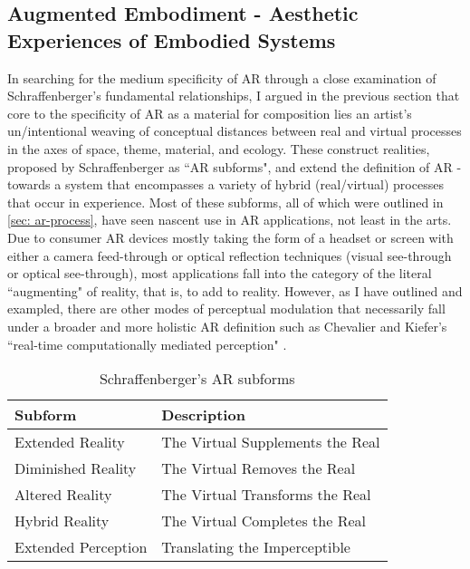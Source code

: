 \subsection[Augmented Embodiment]{Augmented Embodiment - Aesthetic Experiences of Embodied Systems} \label{sec: discussion-medium-embodiment}
In searching for the medium specificity of AR through a close examination of Schraffenberger's fundamental relationships, I argued in the previous section that core to the specificity of AR as a material for composition lies an artist's un/intentional weaving of conceptual distances between real and virtual processes in the axes of space, theme, material, and ecology. These construct realities, proposed by Schraffenberger as ``AR subforms", and extend the definition of AR - towards a system that encompasses a variety of hybrid (real/virtual) processes that occur in experience. Most of these subforms, all of which were outlined in \autoref{sec: ar-process}, have seen nascent use in AR applications, not least in the arts. Due to consumer AR devices mostly taking the form of a headset or screen with either a camera feed-through or optical reflection techniques (visual see-through or optical see-through), most applications fall into the category of the literal ``augmenting" of reality, that is, to add to reality. However, as I have outlined and exampled, there are other modes of perceptual modulation that necessarily fall under a broader and more holistic AR definition such as Chevalier and Kiefer's ``real-time computationally mediated perception" \citeyearpar[]{chevalier2020}.

\begin{table}
    \centering
    \begin{tabular}{ l l }
        \toprule
        Subform             & Description                       \\
        \midrule
        Extended Reality    & The Virtual Supplements the Real  \\
        Diminished Reality  & The Virtual Removes the Real      \\
        Altered Reality     & The Virtual Transforms the Real   \\
        Hybrid Reality      & The Virtual Completes the Real    \\
        Extended Perception & Translating the Imperceptible     \\
        \bottomrule
    \end{tabular}
    \caption{Schraffenberger's AR subforms}\label{table:schraffenbergertaxonomy3}
\end{table}

